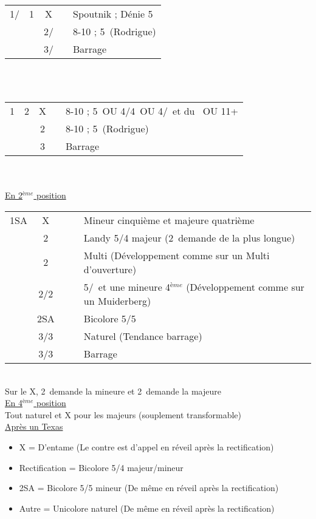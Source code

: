 \documentclass[a4paper, oneside, 11pt]{report}
\begin{document}
		\begin{tabular}{cccc|l}
		1\trefle/\carreau & 1\pique & X && Spoutnik ; Dénie 5\coeur\\
		&& 2\trefle/\carreau && 8-10 ; 5\coeur\ (Rodrigue)\\
		&& 3\trefle/\carreau && Barrage\\
		\end{tabular}\\\\

		\begin{tabular}{cccc|l}
		1\carreau & 2\trefle & X && 8-10 ; 5\pique\ OU 4\coeur/4\pique\ OU 4\coeur/\pique\ et du \carreau\ OU 11+\\
		&& 2\carreau && 8-10 ; 5\coeur\ (Rodrigue)\\
		&& 3\carreau && Barrage\\
		\end{tabular}\\\\

	\underline{En 2$^{ème}$ position}
	
	\begin{tabular}{cccc|l}
	1SA & X &&& Mineur cinquième et majeure quatrième\\
	& 2\trefle &&& Landy 5/4 majeur (2\carreau\ demande de la plus longue)\\
	& 2\carreau &&& Multi (Développement comme sur un Multi d'ouverture)\\
	& 2\coeur/2\pique &&& 5\coeur/\pique\ et une mineure 4$^{ème}$ (Développement comme sur un Muiderberg)\\
	& 2SA &&& Bicolore 5\trefle/5\carreau\\
	& 3\trefle/3\carreau &&& Naturel (Tendance barrage)\\
	& 3\coeur/3\pique &&& Barrage\\
	\end{tabular}\\
	Sur le X, 2\trefle\ demande la mineure et 2\carreau\ demande la majeure\\
	
	\underline{En 4$^{ème}$ position}\\
	Tout naturel et X pour les majeurs (souplement transformable)\\

	\underline{Après un Texas}
	
	\begin{itemize}
	\item X = D'entame (Le contre est d'appel en réveil après la rectification)
	\item Rectification = Bicolore 5/4 majeur/mineur
	\item 2SA = Bicolore 5/5 mineur (De même en réveil après la rectification)
	\item Autre = Unicolore naturel (De même en réveil après la rectification)\\
	\end{itemize}
\end{document}
